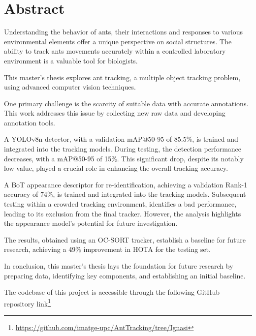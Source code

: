 
\section*{Abstract}

{
    Understanding the behavior of ants, their interactions and responses to various environmental elements offer a unique perspective on social structures. 
    The ability to track ants movements accurately within a controlled laboratory environment is a valuable tool for biologists. 
}

{
    This master's thesis explores ant tracking, a multiple object tracking problem, using advanced computer vision techniques.
}

{
    One primary challenge is the scarcity of suitable data with accurate annotations. 
    This work addresses this issue by collecting new raw data and developing annotation tools.
}

{
    A YOLOv8n detector, with a validation mAP@50-95 of 85.5\%, is trained and integrated into the tracking models. 
    During testing, the detection performance decreases, with a mAP@50-95 of 15\%. 
    This significant drop, despite its notably low value, played a crucial role in enhancing the overall tracking accuracy.
}

{
    A BoT appearance descriptor for re-identification, 
    achieving a validation Rank-1 accuracy of 74\%, is trained and integrated into the tracking models. 
    Subsequent testing within a crowded tracking environment, identifies a bad performance, leading to its exclusion from the final tracker. 
    However, the analysis highlights the appearance model's potential for future investigation.
}

{
    The results, obtained using an OC-SORT tracker, 
    establish a baseline for future research, achieving a 49\% improvement in HOTA for the testing set.
}

{
    In conclusion, this master's thesis lays the foundation for future research by preparing data, 
    identifying key components, and establishing an initial baseline.
}

{
    The codebase of this project is accessible through the following GitHub repository link\footnote{\url{https://github.com/imatge-upc/AntTracking/tree/Ignasi}}
}
